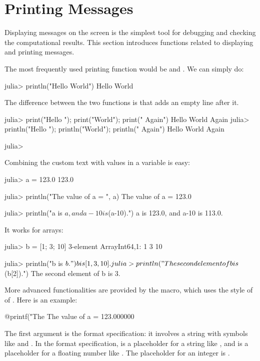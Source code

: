 \section{Printing Messages}

Displaying messages on the screen is the simplest tool for debugging and checking the computational results. This section introduces functions related to displaying and printing messages.

The most frequently used printing function would be  and . We can simply do:
\begin{code}
julia> println("Hello World")
Hello World
\end{code}
\noindent The difference between the two functions is that  adds an empty line after it.
\begin{code}
julia> print("Hello "); print("World"); print(" Again")
Hello World Again
julia> println("Hello "); println("World"); println(" Again")
Hello
World
 Again

julia>
\end{code}

Combining the custom text with values in a variable is easy:
\begin{code}
julia> a = 123.0
123.0

julia> println("The value of a = ", a)
The value of a = 123.0

julia> println("a is $a, and a-10 is $(a-10).")
a is 123.0, and a-10 is 113.0.
\end{code}
\noindent It works for arrays:
\begin{code}
julia> b = [1; 3; 10]
3-element Array{Int64,1}:
  1
  3
 10

julia> println("b is $b.")
b is [1,3,10].

julia> println("The second element of b is $(b[2]).")
The second element of b is 3.
\end{code}

More advanced functionalities are provided by the  macro, which uses the style of  of . Here is an example:
\begin{code}
@printf("The %
The value of a = 123.000000
\end{code}
\noindent The first argument is the format specification: it involves a string with symbols like  and . In the format specification,  is a placeholder for a string like , and  is a placeholder for a floating number like . The placeholder for an integer is .

